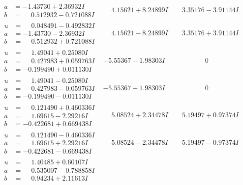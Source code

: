 \documentclass[1p]{elsarticle_modified}
\theoremstyle{definition}
\begin{document}
$$\begin{array}{c|c|c}
\begin{aligned}
a &= -1.43730 + 2.36932 I \\
b &= \phantom{-}0.512932 - 0.721088 I\end{aligned}
 & \phantom{-}4.15621 + 8.24899 I & \phantom{-}3.35176 - 3.91144 I \\ \hline\begin{aligned}
u &= \phantom{-}0.048491 - 0.492832 I \\
a &= -1.43730 - 2.36932 I \\
b &= \phantom{-}0.512932 + 0.721088 I\end{aligned}
 & \phantom{-}4.15621 - 8.24899 I & \phantom{-}3.35176 + 3.91144 I \\ \hline\begin{aligned}
u &= \phantom{-}1.49041 + 0.25080 I \\
a &= \phantom{-}0.427983 + 0.059763 I \\
b &= -0.199490 + 0.011130 I\end{aligned}
 & -5.55367 - 1.98303 I & \phantom{-0.000000 } 0 \\ \hline\begin{aligned}
u &= \phantom{-}1.49041 - 0.25080 I \\
a &= \phantom{-}0.427983 - 0.059763 I \\
b &= -0.199490 - 0.011130 I\end{aligned}
 & -5.55367 + 1.98303 I & \phantom{-0.000000 } 0 \\ \hline\begin{aligned}
u &= \phantom{-}0.121490 + 0.460336 I \\
a &= \phantom{-}1.69615 - 2.29216 I \\
b &= -0.422681 + 0.669438 I\end{aligned}
 & \phantom{-}5.08524 + 2.34478 I & \phantom{-}5.19497 + 0.97374 I \\ \hline\begin{aligned}
u &= \phantom{-}0.121490 - 0.460336 I \\
a &= \phantom{-}1.69615 + 2.29216 I \\
b &= -0.422681 - 0.669438 I\end{aligned}
 & \phantom{-}5.08524 - 2.34478 I & \phantom{-}5.19497 - 0.97374 I \\ \hline\begin{aligned}
u &= \phantom{-}1.40485 + 0.60107 I \\
a &= \phantom{-}0.535007 - 0.788858 I \\
b &= \phantom{-}0.94234 + 2.11613 I\end{aligned}

\end{array}$$
\end{document}

